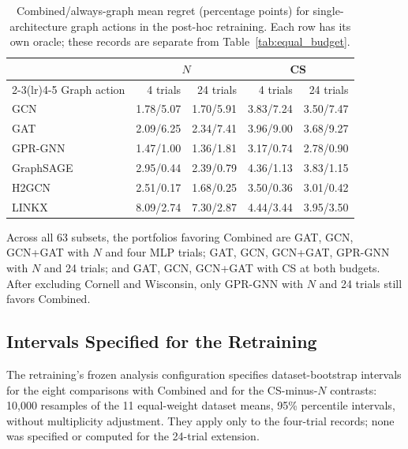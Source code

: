 \begin{table}[ht]
\centering
\caption{Combined/always-graph mean regret (percentage points) for single-architecture graph actions in the post-hoc retraining. Each row has its own oracle; these records are separate from Table~\ref{tab:equal_budget}.}
\label{tab:mlp_budget_single}
\small
\begin{tabular}{@{}lrrrr@{}}
\toprule
 & \multicolumn{2}{c}{$N$} & \multicolumn{2}{c}{CS} \\
\cmidrule(lr){2-3}\cmidrule(lr){4-5}
Graph action & 4 trials & 24 trials & 4 trials & 24 trials \\
\midrule
GCN & 1.78/5.07 & 1.70/5.91 & 3.83/7.24 & 3.50/7.47 \\
GAT & 2.09/6.25 & 2.34/7.41 & 3.96/9.00 & 3.68/9.27 \\
GPR-GNN & 1.47/1.00 & 1.36/1.81 & 3.17/0.74 & 2.78/0.90 \\
GraphSAGE & 2.95/0.44 & 2.39/0.79 & 4.36/1.13 & 3.83/1.15 \\
H2GCN & 2.51/0.17 & 1.68/0.25 & 3.50/0.36 & 3.01/0.42 \\
LINKX & 8.09/2.74 & 7.30/2.87 & 4.44/3.44 & 3.95/3.50 \\
\bottomrule
\end{tabular}
\end{table}

Across all 63 subsets, the portfolios favoring Combined are GAT, GCN, GCN+GAT with $N$ and four MLP trials; GAT, GCN, GCN+GAT, GPR-GNN with $N$ and 24 trials; and GAT, GCN, GCN+GAT with CS at both budgets. After excluding Cornell and Wisconsin, only GPR-GNN with $N$ and 24 trials still favors Combined.

\subsection{Intervals Specified for the Retraining}

The retraining's frozen analysis configuration specifies dataset-bootstrap intervals for the eight comparisons with Combined and for the CS-minus-$N$ contrasts: 10,000 resamples of the 11 equal-weight dataset means, 95\% percentile intervals, without multiplicity adjustment. They apply only to the four-trial records; none was specified or computed for the 24-trial extension.

